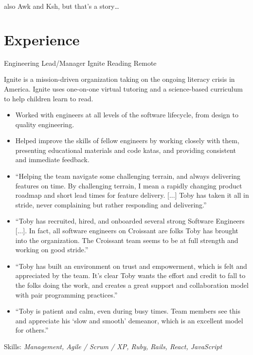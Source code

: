 \documentclass[11pt,letterpaper]{moderncv}
\begin{document}
 {\tiny also Awk and Ksh, but that's a story\ldots}

\section{Experience}

 {Engineering Lead/Manager} {Ignite
  Reading} {Remote} {} { %
  Ignite is a mission-driven organization taking on the ongoing literacy
  crisis in America.  Ignite uses one-on-one virtual tutoring and a
  science-based curriculum to help children learn to read.
  \begin{itemize}
  \item Worked with engineers at all levels of the software lifecycle, from
    design to quality engineering.
  \item Helped improve the skills of fellow engineers by working closely with
    them, presenting educational materials and code katas, and providing
    consistent and immediate feedback.
  \item “Helping the team navigate some challenging terrain, and always
    delivering features on time.  By challenging terrain, I mean a rapidly
    changing product roadmap and short lead times for feature delivery.  [...]
    Toby has taken it all in stride, never complaining but rather responding
    and delivering.”
  \item “Toby has recruited, hired, and onboarded several strong Software
    Engineers [...].  In fact, all software engineers on Croissant are folks
    Toby has brought into the organization.  The Croissant team seems to be at
    full strength and working on good stride.”
  \item “Toby has built an environment on trust and empowerment, which is felt
    and appreciated by the team.  It's clear Toby wants the effort and credit
    to fall to the folks doing the work, and creates a great support and
    collaboration model with pair programming practices.”
  \item “Toby is patient and calm, even during busy times. Team members see
    this and appreciate his ‘slow and smooth’ demeanor, which is an excellent
    model for others.”
  \end{itemize}
  Skills: \emph{Management, Agile / Scrum / XP, Ruby, Rails, React, JavaScript}
}
\end{document}
